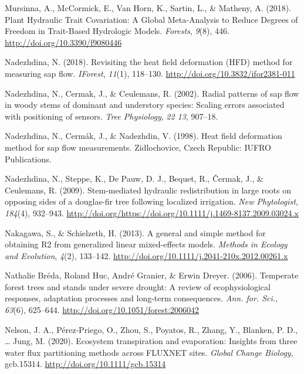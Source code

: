 \documentclass[11pt,twoside]{reedthesis}
\begin{document}
\hypertarget{ref-mursinna_plant_2018}{}
Mursinna, A., McCormick, E., Van Horn, K., Sartin, L., \& Matheny, A.
(2018). Plant Hydraulic Trait Covariation: A Global Meta-Analysis to
Reduce Degrees of Freedom in Trait-Based Hydrologic Models.
\emph{Forests}, \emph{9}(8), 446. \url{http://doi.org/10.3390/f9080446}

\hypertarget{ref-Nadezhdina2018}{}
Nadezhdina, N. (2018). Revisiting the heat field deformation (HFD)
method for measuring sap flow. \emph{IForest}, \emph{11}(1), 118--130.
\url{http://doi.org/10.3832/ifor2381-011}

\hypertarget{ref-Nadezhdina2002}{}
Nadezhdina, N., Cermak, J., \& Ceulemans, R. (2002). Radial patterns of
sap flow in woody stems of dominant and understory species: Scaling
errors associated with positioning of sensors. \emph{Tree Physiology},
\emph{22 13}, 907--18.

\hypertarget{ref-Nadezhdina1998}{}
Nadezhdina, N., Cermák, J., \& Nadezhdin, V. (1998). Heat field
deformation method for sap flow measurements. Zidlochovice, Czech
Republic: IUFRO Publications.

\hypertarget{ref-Nadezhdina2009}{}
Nadezhdina, N., Steppe, K., De Pauw, D. J., Bequet, R., Čermak, J., \&
Ceulemans, R. (2009). Stem-mediated hydraulic redistribution in large
roots on opposing sides of a douglas-fir tree following localized
irrigation. \emph{New Phytologist}, \emph{184}(4), 932--943.
\url{http://doi.org/https://doi.org/10.1111/j.1469-8137.2009.03024.x}

\hypertarget{ref-Nakagawa2013}{}
Nakagawa, S., \& Schielzeth, H. (2013). A general and simple method for
obtaining R2 from generalized linear mixed-effects models. \emph{Methods
in Ecology and Evolution}, \emph{4}(2), 133--142.
\url{http://doi.org/10.1111/j.2041-210x.2012.00261.x}

\hypertarget{ref-Breda2006}{}
Nathalie Bréda, Roland Huc, André Granier, \& Erwin Dreyer. (2006).
Temperate forest trees and stands under severe drought: A review of
ecophysiological responses, adaptation processes and long-term
consequences. \emph{Ann. for. Sci.}, \emph{63}(6), 625--644.
\url{http://doi.org/10.1051/forest:2006042}

\hypertarget{ref-nelson_ecosystem_2020}{}
Nelson, J. A., Pérez‐Priego, O., Zhou, S., Poyatos, R., Zhang, Y.,
Blanken, P. D., \ldots{} Jung, M. (2020). Ecosystem transpiration and
evaporation: Insights from three water flux partitioning methods across
FLUXNET sites. \emph{Global Change Biology}, gcb.15314.
\url{http://doi.org/10.1111/gcb.15314}
\end{document}
